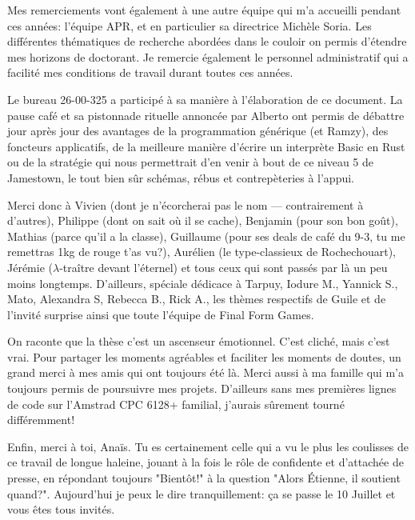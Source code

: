 
Mes remerciements vont également à une autre équipe qui m'a accueilli pendant
ces années: l'équipe APR, et en particulier sa directrice Michèle Soria. Les
différentes thématiques de recherche abordées dans le couloir on permis
d'étendre mes horizons de doctorant. Je remercie également le personnel
administratif qui a facilité mes conditions de travail durant toutes ces années.


\setlength{\marginparwidth}{30mm}
Le bureau 26-00-325 a participé à sa manière à l'élaboration de ce document. La
pause café et sa pistonnade rituelle annoncée par Alberto ont permis de débattre
jour après jour des avantages de la programmation générique (et Ramzy), des
foncteurs applicatifs, de la meilleure manière d'écrire un interprète Basic en
Rust ou de la stratégie qui nous permettrait d'en venir à bout de ce niveau 5 de
Jamestown, le tout bien sûr schémas, rébus et contrepèteries à l'appui.

Merci donc à Vivien (dont je n'écorcherai pas le nom --- contrairement à
d'autres), Philippe (dont on sait où il se cache), Benjamin (pour son bon goût),
Mathias (parce qu'il a la classe), Guillaume (pour ses deals de café du 9-3, tu
me remettras 1kg de rouge t'as vu?), Aurélien (le type-classieux de
Rochechouart), Jérémie ($λ$-traître devant l'éternel) et tous ceux qui sont
passés par là un peu moins longtemps. D'ailleurs, spéciale dédicace à Tarpuy,
Iodure M., Yannick S., Mato, Alexandra S, Rebecca B., Rick A., les thèmes
respectifs de Guile et de l'invité surprise ainsi que toute l'équipe de Final
Form Games.


On raconte que la thèse c'est un ascenseur émotionnel. C'est cliché, mais c'est
vrai. Pour partager les moments agréables et faciliter les moments de doutes, un
grand merci à mes amis qui ont toujours été là. Merci aussi à ma famille qui m'a
toujours permis de poursuivre mes projets. D'ailleurs sans mes premières lignes
de code sur l'Amstrad CPC 6128+ familial, j'aurais sûrement tourné différemment!


Enfin, merci à toi, Anaïs. Tu es certainement celle qui a vu le plus les
coulisses de ce travail de longue haleine, jouant à la fois le rôle de
confidente et d'attachée de presse, en répondant toujours "Bientôt!" à la
question "Alors Étienne, il soutient quand?". Aujourd'hui je peux le dire
tranquillement: ça se passe le 10 Juillet et vous êtes tous invités.

